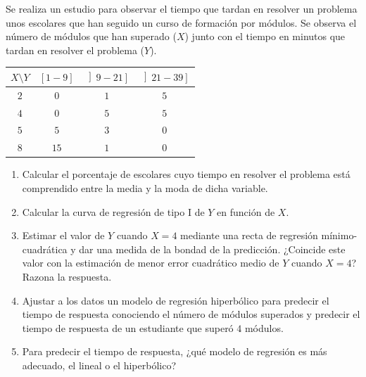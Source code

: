 \documentclass[12pt]{article}
\begin{document}
    \begin{ejercicio}[2 puntos]
        Se realiza un estudio para observar el tiempo que tardan en resolver un problema unos escolares que han seguido un curso de formación por módulos. Se observa el número de módulos que han superado ($X$) junto con el tiempo en minutos que tardan en resolver el problema ($Y$).
        \begin{table}
            
        \end{table}
            \begin{tabular}{|c|ccc|}
                \hline
                $X \setminus Y$ & $\left[1-9\right]$ & $\left]9-21\right]$ & $\left]21-39\right]$ \\ \hline
                $2$ & $0$ & $1$ & $5$ \\
                $4$ & $0$ & $5$ & $5$ \\
                $5$ & $5$ & $3$ & $0$ \\
                $8$ & $15$ & $1$ & $0$ \\ \hline
            \end{tabular}
        \begin{center}
        
        \end{center}

        \begin{enumerate}[label=\alph*)]
            \item Calcular el porcentaje de escolares cuyo tiempo en resolver el problema está comprendido entre la media y la moda de dicha variable.
            \item Calcular la curva de regresión de tipo I de $Y$ en función de $X$.
            \item Estimar el valor de $Y$ cuando $X=4$ mediante una recta de regresión mínimo-cuadrática y dar una medida de la bondad de la predicción. ¿Coincide este valor con la estimación de menor error cuadrático medio de $Y$ cuando $X=4$? Razona la respuesta.
            \item Ajustar a los datos un modelo de regresión hiperbólico para predecir el tiempo de respuesta conociendo el número de módulos superados y predecir el tiempo de respuesta de un estudiante que superó $4$ módulos.
            \item Para predecir el tiempo de respuesta, ¿qué modelo de regresión es más adecuado, el lineal o el hiperbólico?
        \end{enumerate}
    \end{ejercicio}
\end{document}
